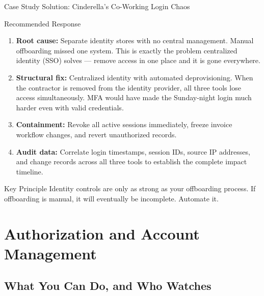 \documentclass[aspectratio=169]{beamer}  %
\begin{document}
\begin{frame}{Case Study Solution: Cinderella's Co-Working Login Chaos}
    \begin{exampleblock}{Recommended Response}
        \footnotesize
        \begin{enumerate}
            \item \textbf{Root cause:} Separate identity stores with no central management. Manual offboarding missed one system. This is exactly the problem centralized identity (SSO) solves --- remove access in one place and it is gone everywhere.
            \item \textbf{Structural fix:} Centralized identity with automated deprovisioning. When the contractor is removed from the identity provider, all three tools lose access simultaneously. MFA would have made the Sunday-night login much harder even with valid credentials.
            \item \textbf{Containment:} Revoke all active sessions immediately, freeze invoice workflow changes, and revert unauthorized records.
            \item \textbf{Audit data:} Correlate login timestamps, session IDs, source IP addresses, and change records across all three tools to establish the complete impact timeline.
        \end{enumerate}
    \end{exampleblock}
    \begin{alertblock}{Key Principle}
        \footnotesize
        Identity controls are only as strong as your offboarding process. If offboarding is manual, it will eventually be incomplete. Automate it.
    \end{alertblock}
\end{frame}

\section{Authorization and Account Management}
\subsection{What You Can Do, and Who Watches}

\end{document}
